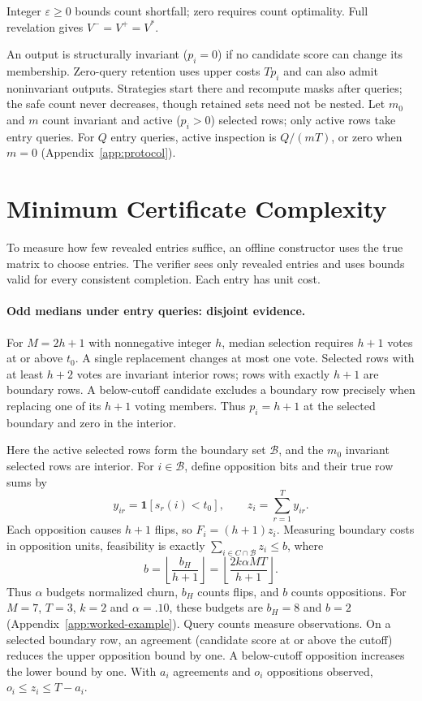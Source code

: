 \documentclass[11pt]{article}
\newcommand{\one}{\mathbf{1}}
\begin{document}
Integer $\varepsilon\ge0$ bounds count shortfall; zero requires count optimality. Full revelation gives $V^-=V^+=V^*$.

An output is structurally invariant ($p_i=0$) if no candidate score can change its membership. Zero-query retention uses upper costs $Tp_i$ and can also admit noninvariant outputs. Strategies start there and recompute masks after queries; the safe count never decreases, though retained sets need not be nested. Let $m_0$ and $m$ count invariant and active ($p_i>0$) selected rows; only active rows take entry queries. For $Q$ entry queries, active inspection is $Q/(mT)$, or zero when $m=0$ (Appendix~\ref{app:protocol}).

\section{Minimum Certificate Complexity}
\label{sec:median}
To measure how few revealed entries suffice, an offline constructor uses the true matrix to choose entries. The verifier sees only revealed entries and uses bounds valid for every consistent completion. Each entry has unit cost.

\paragraph{Odd medians under entry queries: disjoint evidence.}
For $M=2h+1$ with nonnegative integer $h$, median selection requires $h+1$ votes at or above $t_0$. A single replacement changes at most one vote. Selected rows with at least $h+2$ votes are invariant interior rows; rows with exactly $h+1$ are boundary rows. A below-cutoff candidate excludes a boundary row precisely when replacing one of its $h+1$ voting members. Thus $p_i=h+1$ at the selected boundary and zero in the interior.

Here the active selected rows form the boundary set $\mathcal B$, and the $m_0$ invariant selected rows are interior. For $i\in\mathcal B$, define opposition bits and their true row sums by
\[
 y_{ir}=\one[s_r(i)<t_0],\qquad z_i=\sum_{r=1}^{T}y_{ir}.
\]
Each opposition causes $h+1$ flips, so $F_i=(h+1)z_i$. Measuring boundary costs in opposition units, feasibility is exactly $\sum_{i\in C\cap\mathcal B}z_i\le b$, where
\begin{equation}
 b=\left\lfloor\frac{b_H}{h+1}\right\rfloor=\left\lfloor\frac{2k\alpha MT}{h+1}\right\rfloor.
 \label{eq:booleanbudget}
\end{equation}
Thus $\alpha$ budgets normalized churn, $b_H$ counts flips, and $b$ counts oppositions. For $M=7$, $T=3$, $k=2$ and $\alpha=.10$, these budgets are $b_H=8$ and $b=2$ (Appendix~\ref{app:worked-example}). Query counts measure observations. On a selected boundary row, an agreement (candidate score at or above the cutoff) reduces the upper opposition bound by one. A below-cutoff opposition increases the lower bound by one. With $a_i$ agreements and $o_i$ oppositions observed, $o_i\le z_i\le T-a_i$.
\end{document}
